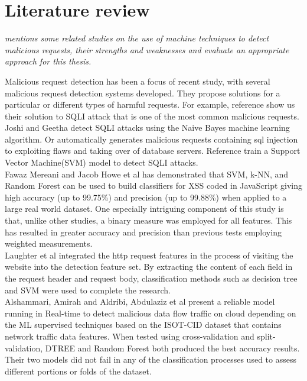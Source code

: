 \chapter{Literature review}
\label{chap:literaturereview}
	\textit{mentions some related studies on the use of machine techniques to detect malicious requests, their strengths and weaknesses and evaluate an appropriate approach for this thesis.}
	\minitoc

Malicious request detection has been a focus of recent study, with several malicious request detection systems developed. They propose solutions for a particular or different types of harmful requests. For example, reference \cite{Joshi_sqli} show us their solution to SQLI attack that is one of the most common malicious requests. Joshi and Geetha \cite{Joshi_sqli} detect SQLI attacks using the Naive Bayes machine learning algorithm. Or \cite{sqlmap} automatically generates malicious requests containing sql injection to exploiting flaws and taking over of database servers. Reference \cite{sqli_ML} train a Support Vector Machine(SVM) model to detect SQLI attacks.\\ \newline
Fawaz Mereani and Jacob Howe et al\cite{Mereani2018} has demonstrated that SVM, k-NN, and Random Forest can be used to build classiﬁers for XSS coded in JavaScript giving high accuracy (up to 99.75\%) and precision (up to 99.88\%) when applied to a large real world dataset. One especially intriguing component of this study is that, unlike other studies, a binary measure was employed for all features. This has resulted in greater accuracy and precision than previous tests employing weighted measurements.\\ \newline
Laughter et al \cite{laughter2021} integrated the http request features in the process of visiting the website into the detection feature set. By extracting the content of each field in the request header and request body, classification methods such as decision tree and SVM were used to complete the research.\\
\newline
Alshammari, Amirah and Aldribi, Abdulaziz et al \cite{Alshammari2021} present a reliable model running in Real-time to detect malicious data flow traffic on cloud depending on the ML supervised techniques based on the ISOT-CID dataset that contains network traffic data features. When tested using cross-validation and split-validation, DTREE and Random Forest both produced the best accuracy results. Their two models did not fail in any of the classification processes used to assess different portions or folds of the dataset.\\
